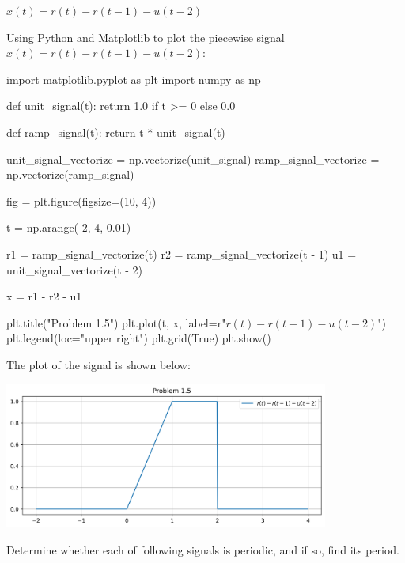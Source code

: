 \documentclass[a4paper, 10pt]{article}
\begin{document}
\begin{tosubmit}
\begin{subproblems}[start=5]
    \item \( x(t) = r(t) - r(t - 1) - u(t - 2) \)
\end{subproblems}

\par\noindent\submitsolution
Using Python and Matplotlib to plot the piecewise signal \( x(t) = r(t) - r(t - 1) - u(t - 2) \):
\begin{codingbox}
import matplotlib.pyplot as plt
import numpy as np

def unit_signal(t):
    return 1.0 if t >= 0 else 0.0

def ramp_signal(t):
    return t * unit_signal(t)

unit_signal_vectorize = np.vectorize(unit_signal)
ramp_signal_vectorize = np.vectorize(ramp_signal)

fig = plt.figure(figsize=(10, 4))

t = np.arange(-2, 4, 0.01)

r1 = ramp_signal_vectorize(t)
r2 = ramp_signal_vectorize(t - 1)
u1 = unit_signal_vectorize(t - 2)

x = r1 - r2 - u1

plt.title("Problem 1.5")
plt.plot(t, x, label=r"$r(t) - r(t-1) - u(t-2)$")
plt.legend(loc="upper right")
plt.grid(True)
plt.show()
\end{codingbox}

The plot of the signal is shown below:
\begin{center}
    \includegraphics[width=0.8\textwidth]{images/problem_1_5.png}
\end{center}
\end{tosubmit}


\newpage

\begin{problem}
Determine whether each of following signals is periodic, and if so, find its period.
\end{problem}
\end{document}
